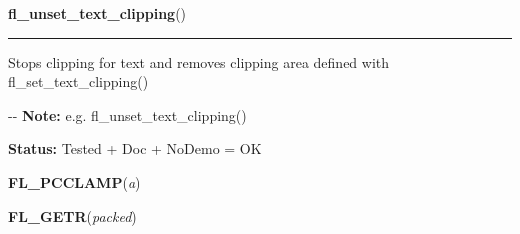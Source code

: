     \label{xformslib:flxbasic:fl_unset_text_clipping}

    \vspace{0.5ex}

\hspace{.8\funcindent}\begin{boxedminipage}{\funcwidth}

    \raggedright \textbf{fl\_unset\_text\_clipping}()

    \vspace{-1.5ex}

    \rule{\textwidth}{0.5\fboxrule}
\setlength{\parskip}{2ex}

Stops clipping for text and removes clipping area defined with
fl\_set\_text\_clipping()

-{}-
\setlength{\parskip}{1ex}
\textbf{Note:} 
e.g. fl\_unset\_text\_clipping()


\textbf{Status:} 
Tested + Doc + NoDemo = OK


    \end{boxedminipage}

    \label{xformslib:flxbasic:FL_PCCLAMP}

    \vspace{0.5ex}

\hspace{.8\funcindent}\begin{boxedminipage}{\funcwidth}

    \raggedright \textbf{FL\_PCCLAMP}(\textit{a})

\setlength{\parskip}{2ex}
\setlength{\parskip}{1ex}
    \end{boxedminipage}

    \label{xformslib:flxbasic:FL_GETR}

    \vspace{0.5ex}

\hspace{.8\funcindent}\begin{boxedminipage}{\funcwidth}

    \raggedright \textbf{FL\_GETR}(\textit{packed})

\setlength{\parskip}{2ex}
\setlength{\parskip}{1ex}
    \end{boxedminipage}

